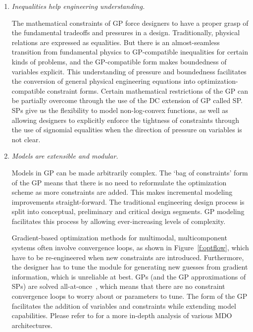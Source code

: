 \begin{enumerate}

    \item \textit{Inequalities help engineering understanding.}

    The mathematical constraints of \gls{GP} force designers to have a proper grasp
    of the fundamental tradeoffs and pressures in a design.
    Traditionally, physical relations are expressed as equalities. But there is an
    almost-seamless transition from fundamental physics to GP-compatible
    inequalities for certain kinds of problems, and the \gls{GP}-compatible
    form makes boundedness of variables explicit. This understanding of pressure
    and boundedness facilitates the conversion of general physical engineering
    equations into optimization-compatible constraint forms.
    Certain mathematical restrictions of the \gls{GP} can be partially
    overcome through the use of the \gls{DC}
    extension of \gls{GP} called \gls{SP}. \gls{SP}s give us the flexibility to model
    non-log-convex functions, as well as allowing designers to explicitly enforce
    the tightness of
    constraints through the use of signomial equalities when the direction of pressure
    on variables is not clear.

    \item \textit{Models are extensible and modular.}

    Models in \gls{GP} can be made arbitrarily complex.
    The `bag of constraints' form of the \gls{GP}
    means that there is no need to reformulate the optimization scheme as more
    constraints are added. This makes incremental modeling improvements straight-forward.
    The traditional engineering design process is split into conceptual, preliminary
    and critical design segments. \gls{GP} modeling facilitates this process by allowing
    ever-increasing levels of complexity.

    Gradient-based optimization methods for
    multimodal, multicomponent systems often involve
    convergence loops, as shown in Figure~\ref{f:optflow}, which have to be re-engineered
    when new constraints are introduced. Furthermore, the designer has to tune
    the module for generating new guesses from gradient information, which is unreliable
    at best. \gls{GP}s (and the \gls{GP} approximations
    of \gls{SP}s) are solved all-at-once~\cite{martins_mdo}, which means that there are no constraint
    convergence loops to worry about or parameters to tune. The
    form of the GP facilitates the addition of variables and constraints while extending
    model capabilities. Please refer to \cite{martins_mdo}
    for a more in-depth analysis of various \gls{MDO} architectures.


\end{enumerate}
